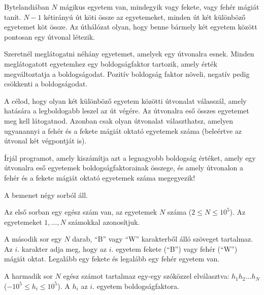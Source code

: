





Bytelandiában $N$ mágikus egyetem van, mindegyik vagy fekete, vagy fehér mágiát tanít. $N-1$ kétirányú út köti össze az egyetemeket, minden út két különböző egyetemet köt össze. Az úthálózat olyan, hogy benne bármely két egyetem között pontosan egy útvonal létezik.

Szeretnél meglátogatni néhány egyetemet, amelyek egy útvonalra esnek.
Minden meglátogatott egyetemhez egy boldogságfaktor tartozik, amely érték megváltoztatja a boldogságodat. Pozitív boldogság faktor növeli, negatív pedig csökkenti a boldogságodat.

A célod, hogy olyan két különböző egyetem közötti útvonalat válasszál, amely hatására a legboldogabb leszel az út végére. Az útvonalra eső összes egyetemet meg kell látogatnod. Azonban csak olyan útvonalat választhatsz, amelyen ugyanannyi a fehér és a fekete mágiát oktató egyetemek száma (beleértve az útvonal két végpontját is). 



Írjál programot, amely kiszámítja azt a legnagyobb boldogság értéket, amely egy útvonalra eső egyetemek boldogságfaktorainak összege, és amely útvonalon a fehér és a fekete mágiát oktató egyetemek száma megegyezik!



A bemenet négy sorból áll.

Az első sorban egy egész szám van, az egyetemek $N$ száma ($2 \leq N \leq 10^5$). Az egyetemeket $1, \ldots, N$ számokkal azonosítjuk.

A második sor egy $N$ darab, ``B'' vagy ``W'' karakterből álló szöveget tartalmaz. Az $i$. karakter adja meg, hogy az $i$. egyetem fekete (``B'') vagy fehér (``W'') mágiát oktat. Legalább egy fekete és legalább egy fehér egyetem van.

A harmadik sor $N$ egész számot tartalmaz egy-egy szóközzel elválasztva: $h_1 h_2 \ldots h_N$ ($-10^5 \leq h_i \leq 10^5$). A $h_i$ az $i$. egyetem boldogságfaktora.

